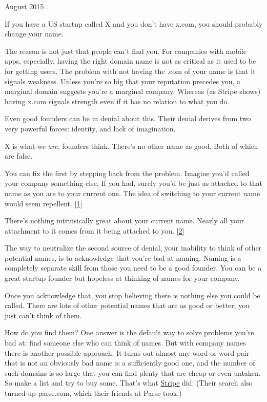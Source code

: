 August 2015

If you have a US startup called X and you don't have x.com, you should
probably change your name.

The reason is not just that people can't find you. For companies with
mobile apps, especially, having the right domain name is not as critical
as it used to be for getting users. The problem with not having the .com
of your name is that it signals weakness. Unless you're so big that your
reputation precedes you, a marginal domain suggests you're a marginal
company. Whereas (as Stripe shows) having x.com signals strength even if
it has no relation to what you do.

Even good founders can be in denial about this. Their denial derives
from two very powerful forces: identity, and lack of imagination.

X is what we \emph{are}, founders think. There's no other name as good.
Both of which are false.

You can fix the first by stepping back from the problem. Imagine you'd
called your company something else. If you had, surely you'd be just as
attached to that name as you are to your current one. The idea of
switching to your current name would seem repellent.
{[}\hyperref[f1n]{1}{]}

There's nothing intrinsically great about your current name. Nearly all
your attachment to it comes from it being attached to you.
{[}\hyperref[f1n]{2}{]}

The way to neutralize the second source of denial, your inability to
think of other potential names, is to acknowledge that you're bad at
naming. Naming is a completely separate skill from those you need to be
a good founder. You can be a great startup founder but hopeless at
thinking of names for your company.

Once you acknowledge that, you stop believing there is nothing else you
could be called. There are lots of other potential names that are as
good or better; you just can't think of them.

How do you find them? One answer is the default way to solve problems
you're bad at: find someone else who can think of names. But with
company names there is another possible approach. It turns out almost
any word or word pair that is not an obviously bad name is a
sufficiently good one, and the number of such domains is so large that
you can find plenty that are cheap or even untaken. So make a list and
try to buy some. That's what
\href{http://www.quora.com/How-did-Stripe-come-up-with-its-name?share=1}{Stripe}
did. (Their search also turned up parse.com, which their friends at
Parse took.)

